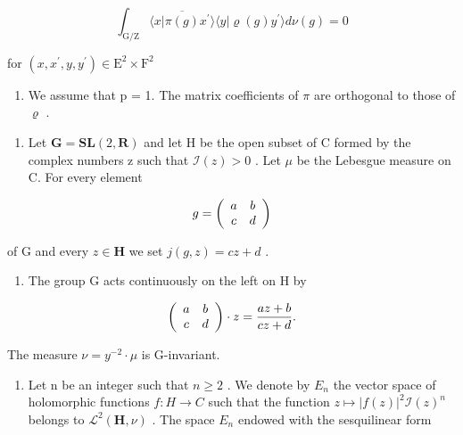 \[
\int_ {\mathrm{G} / \mathrm{Z}} \overline {{\langle x | \pi (g) x ^ {\prime} \rangle}} \langle y | \varrho (g) y ^ {\prime} \rangle d \nu (g) = 0
\]

for \((x,x^{\prime},y,y^{\prime})\in \mathrm{E}^{2}\times \mathrm{F}^{2}\)

\begin{enumerate}
\def\labelenumi{\alph{enumi})}
\setcounter{enumi}{4}
\tightlist
\item
  We assume that p = 1. The matrix coefficients of \(\pi\) are orthogonal to those of \(\varrho\) .
\end{enumerate}

\begin{enumerate}
\def\labelenumi{\arabic{enumi})}
\setcounter{enumi}{15}
\tightlist
\item
  Let \(\mathbf{G} = \mathbf{S}\mathbf{L}(2, \mathbf{R})\) and let H be the open subset of C formed by the complex numbers z such that \(\mathcal{I}(z) > 0\) . Let \(\mu\) be the Lebesgue measure on C. For every element
\end{enumerate}

\[
g = \left( \begin{array}{c c} a & b \\ c & d \end{array} \right)
\]

of G and every \(z \in \mathbf{H}\) we set \(j(g, z) = cz + d\) .

\begin{enumerate}
\def\labelenumi{\alph{enumi})}
\tightlist
\item
  The group G acts continuously on the left on H by
\end{enumerate}

\[
\left( \begin{array}{c c} a & b \\ c & d \end{array} \right) \cdot z = \frac {a z + b}{c z + d}.
\]

The measure \(\nu = y^{-2} \cdot \mu\) is G-invariant.

\begin{enumerate}
\def\labelenumi{\alph{enumi})}
\setcounter{enumi}{1}
\tightlist
\item
  Let n be an integer such that \(n \geqslant 2\) . We denote by \(E_{n}\) the vector space of holomorphic functions \(f: H \to C\) such that the function \(z \mapsto |f(z)|^{2} \mathcal{I}(z)^{n}\) belongs to \(\mathcal{L}^{2}(\mathbf{H}, \nu)\) . The space \(E_{n}\) endowed with the sesquilinear form
\end{enumerate}

